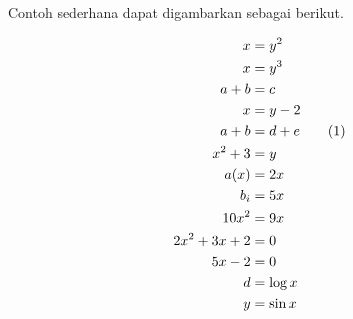 Contoh sederhana dapat digambarkan sebagai berikut.

\begin{align*}
	x &= y^2\\
	x &= y^3\\
	a + b &= c\\
	x &= y - 2\\
	a + b &= d + e \tag{\stepcounter{equation}\theequation}\\
	x^2 + 3 &= y\\
	a(x) &= 2x\\
	b_i &= 5x\\
	10x^2 &= 9x\\
	2x^2 + 3x + 2 &= 0\\
	5x - 2 &= 0\\
	d &= \log x\\
	y &= \sin x
\end{align*}

